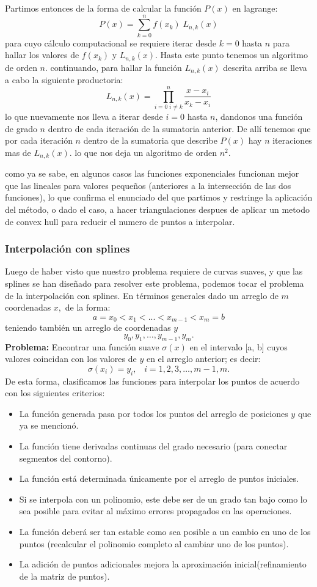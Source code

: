 \documentclass[final, 12pt letterpaper]{article}
\begin{document}
Partimos entonces de la forma de calcular la función $P(x)$ en lagrange:
\[
P(x) = \sum_{k=0}^n f(x_k) \; L_{n,k}(x)
\]
para cuyo cálculo computacional se requiere iterar desde $k=0$ hasta $n$ para hallar los valores de $f(x_k)$ y $L_{n,k}(x)$. Hasta este punto tenemos un algoritmo de orden $n$.
continuando, para hallar la función $L_{n,k}(x)$ descrita arriba se lleva a cabo la siguiente productoria:
\[
L_{n,k}(x) = \prod_{i=0 \; i\not=k}^n \frac{x-x_i}{x_k-x_i}
\]
lo que nuevamente nos lleva a iterar desde $i=0$ hasta $n$, dandonos una función de grado $n$ dentro de cada iteración de la sumatoria anterior. De allí tenemos que por cada iteración $n$ dentro de la sumatoria que describe $P(x)$ hay $n$ iteraciones mas de $L_{n,k}(x)$. lo que nos deja un algoritmo de orden $n^2$.

como ya se sabe, en algunos casos las funciones exponenciales funcionan mejor que las lineales para valores pequeños (anteriores a la intersección de las dos funciones), lo que confirma el enunciado del que partimos y restringe la aplicación del método, o dado el caso, a hacer triangulaciones despues de aplicar un metodo de convex hull para reducir el numero de puntos a interpolar.

\subsubsection{Interpolación con splines}
Luego de haber visto que nuestro problema requiere de curvas suaves, y que las splines se han diseñado para resolver este problema, podemos tocar el problema de la interpolación con splines. En términos generales dado un arreglo de $m$ coordenadas $x,$ de la forma:
\[ a = x_0 < x_1 < ... < x_{m-1} < x_m = b\]
teniendo también un arreglo de coordenadas $y$
\[ y_0, y_1,\ldots,y_{m-1}, y_m.\]
\textbf{Problema:} Encontrar una función suave $\sigma(x)$  en el intervalo [a, b] cuyos valores coincidan con los valores de $y$ en el arreglo anterior; es decir:
\[ \sigma(x_i) = y_i, \;\;\; i = 1, 2, 3,\ldots, m-1, m. \]
De esta forma, clasificamos las funciones para interpolar los puntos de acuerdo con los siguientes criterios:
\begin{itemize}
\item La función generada pasa por todos los puntos del arreglo de posiciones $y$ que ya se mencionó.
\item La función tiene derivadas continuas del grado necesario (para conectar segmentos del contorno).
\item La función está determinada únicamente por el arreglo de puntos iniciales.
\item Si se interpola con un polinomio, este debe ser de un grado tan bajo como lo sea posible para evitar al máximo errores propagados en las operaciones.
\item La función deberá ser tan estable como sea posible a un cambio en uno de los puntos (recalcular el polinomio completo al cambiar uno de los puntos).
\item La adición de puntos adicionales mejora la aproximación inicial(refinamiento de la matriz de puntos).
\end{itemize}
\end{document}
